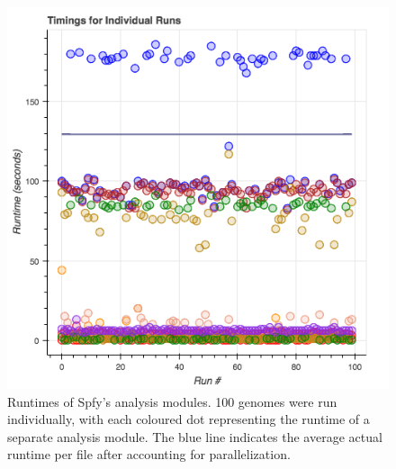 \documentclass{article}
\begin{document}
\begin{figure}[!hb]
\begin{center}
\includegraphics[width=\textwidth]{images/spfy_indivs.png}
\end{center}
\caption{Runtimes of Spfy's analysis modules. 100 genomes were run individually, with each coloured dot representing the runtime of a separate analysis module. The blue line indicates the average actual runtime per file after accounting for parallelization.}\label{fig:spfy_performance_indivs}
\end{figure}
\end{document}
